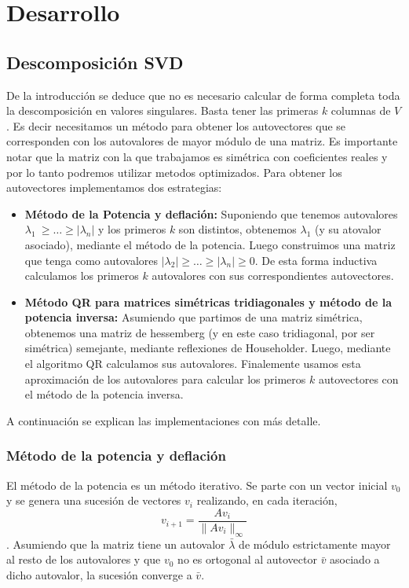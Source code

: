 \section{Desarrollo}

\subsection{Descomposici\'on SVD}

	\PARstart De la introducci\'on se deduce que no es necesario calcular de forma
	completa toda la descomposici\'on en valores singulares. Basta tener
	las primeras $k$ columnas de $V$. Es decir necesitamos un m\'etodo para
	obtener los autovectores que se corresponden con los autovalores de mayor
	m\'odulo de una matriz.
	Es importante notar que la matriz con la que trabajamos es sim\'etrica
	con coeficientes reales y por lo tanto podremos utilizar metodos optimizados.
	Para obtener los autovectores implementamos dos estrategias:

	\begin{itemize}
		\item \textbf{M\'etodo de la Potencia y deflaci\'on:} Suponiendo que
		tenemos autovalores $\lambda_1\ \geq \ldots \geq |\lambda_n|$ y los primeros
		$k$ son distintos, obtenemos $\lambda_1$ (y su atovalor asociado),
		mediante el m\'etodo de la potencia. Luego
		construimos una matriz que tenga como autovalores
		$|\lambda_2| \geq \ldots \geq |\lambda_n| \geq 0$.
		De esta forma inductiva calculamos los primeros $k$ autovalores
		con sus correspondientes autovectores.

		\item \textbf{M\'etodo QR para matrices sim\'etricas tridiagonales y
		m\'etodo de la potencia inversa:} Asumiendo que partimos de una matriz
		sim\'etrica, obtenemos una matriz de hessemberg (y en este caso
		tridiagonal, por ser sim\'etrica) semejante, mediante reflexiones de
		Householder. Luego, mediante el algoritmo QR calculamos sus
		autovalores. Finalemente usamos esta aproximaci\'on de
		los autovalores para calcular los primeros $k$ autovectores con el m\'etodo
		de la potencia inversa.
	\end{itemize}

	A continuaci\'on se explican las implementaciones con m\'as detalle.

	\subsubsection{M\'etodo de la potencia y deflaci\'on}
		El m\'etodo de la potencia es un m\'etodo iterativo. Se parte con un vector
		inicial $v_0$ y se genera una sucesi\'on de vectores ${v_i}$ realizando,
		en cada iteraci\'on, $$v_{i+1} = \frac{Av_i}{\|Av_i\|_{\infty}}$$.
		Asumiendo que la matriz tiene un autovalor $\bar{\lambda}$ de m\'odulo
		estrictamente
		mayor al resto de los autovalores y que $v_0$ no es ortogonal al
		autovector $\bar{v}$ asociado a dicho autovalor, la sucesi\'on converge 
		a $\bar{v}$.


